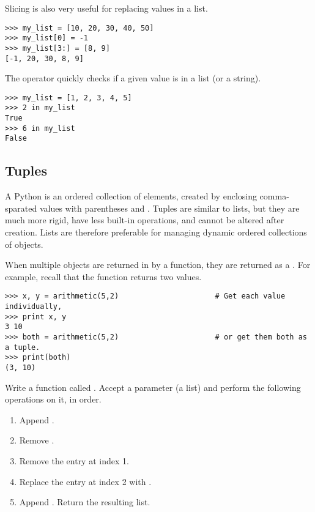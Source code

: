 Slicing is also very useful for replacing values in a list.
\begin{lstlisting}
>>> my_list = [10, 20, 30, 40, 50]
>>> my_list[0] = -1
>>> my_list[3:] = [8, 9]
[-1, 20, 30, 8, 9]
\end{lstlisting}

The  operator quickly checks if a given value is in a list (or a string).
\begin{lstlisting}
>>> my_list = [1, 2, 3, 4, 5]
>>> 2 in my_list
True
>>> 6 in my_list
False
\end{lstlisting}

\subsection*{Tuples}
A Python  is an ordered collection of elements, created by enclosing comma-sparated values with parentheses \li{(} and \li{)}.
Tuples are similar to lists, but they are much more rigid, have less built-in operations, and cannot be altered after creation.
Lists are therefore preferable for managing dynamic ordered collections of objects.

When multiple objects are returned in by a function, they are returned as a .
For example, recall that the  function returns two values.

\begin{lstlisting}
>>> x, y = arithmetic(5,2)                      # Get each value individually,
>>> print x, y
3 10
>>> both = arithmetic(5,2)                      # or get them both as a tuple.
>>> print(both)
(3, 10)
\end{lstlisting}

\begin{problem}
Write a function called .
Accept a parameter (a list) and perform the following operations on it, in order.
\begin{enumerate}
\item Append .
\item Remove .
\item Remove the entry at index 1.
\item Replace the entry at index 2 with .
\item Append .
Return the resulting list.
\end{enumerate}
\end{problem}

